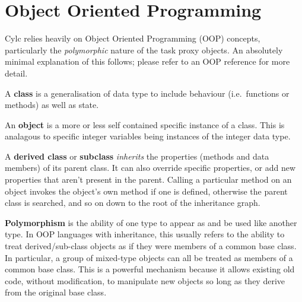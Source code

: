 \documentclass[11pt,a4paper]{article}
\begin{document}
\section{Object Oriented Programming}
\label{ObjectOrientedProgramming}

Cylc relies heavily on Object Oriented Programming (OOP) concepts,
particularly the {\em polymorphic} nature of the task proxy objects.
An absolutely minimal explanation of this follows; 
please refer to an OOP reference for more detail.

A {\bf class} is a generalisation of data type to include behaviour
(i.e.\ functions or methods) as well as state. 


An {\bf object} is a more or less self contained specific instance
of a class. This is analagous to specific integer variables being 
instances of the integer data type.

A {\bf derived class} or {\bf subclass} {\em inherits} the properties
(methods and data members) of its parent class. It can also override
specific properties, or add new properties that aren't present in the
parent. Calling a particular method on an object invokes the object's
own method if one is defined, otherwise the parent class is searched,
and so on down to the root of the inheritance graph. 



{\bf Polymorphism} is the ability of one type to appear as and be used
like another type.  In OOP languages with inheritance, this usually
refers to the ability to treat derived/sub-class objects as if they were
members of a common base class. In particular, a group of mixed-type
objects can all be treated as members of a common base class. 
This is a powerful mechanism because it allows existing old code,
without modification, to manipulate new objects so long as they 
derive from the original base class.
\end{document}
